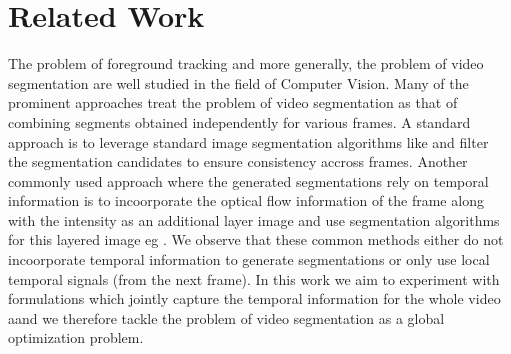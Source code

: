 \section{Related Work}
The problem of foreground tracking and more generally, the problem of video segmentation are well studied in the field of Computer Vision. Many of the prominent approaches treat the problem of video segmentation as that of combining segments obtained independently for various frames. A standard approach is to leverage standard image segmentation algorithms like \cite{CPMC} and filter the segmentation candidates to ensure consistency accross frames. Another commonly used approach where the generated segmentations rely on temporal information is to incoorporate the optical flow information of the frame along with the intensity as an additional layer image and use segmentation algorithms for this layered image eg \cite{LeordeanuSS12}. We observe that these common methods either do not incoorporate temporal information to generate segmentations or only use local temporal signals (from the next frame). In this work we aim to experiment with formulations which jointly capture the temporal information for the whole video aand we therefore tackle the problem of video segmentation as a global optimization problem.
